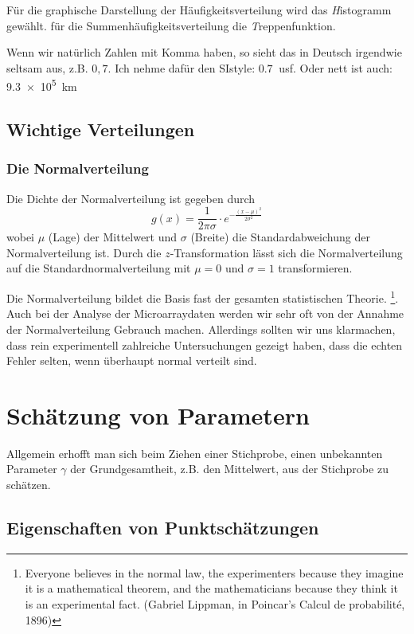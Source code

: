 Für die graphische Darstellung der Häufigkeitsverteilung wird das {\textit Histogramm} gewählt. für die Summenhäufigkeitsverteilung die {\textit Treppenfunktion}.

Wenn wir natürlich Zahlen mit Komma haben, so sieht das in Deutsch irgendwie seltsam aus, z.B. $0,7$. Ich nehme dafür den SIstyle: $\SI{0,7}{}$ usf.  Oder nett ist auch: \SI{9.3e5}{km}


%
\subsection{Wichtige Verteilungen}

\subsubsection{Die Normalverteilung}
Die Dichte der Normalverteilung ist gegeben durch
\begin{equation}\label{eqn:dichtenormal}
g(x) = \frac{1}{2\pi\sigma}\cdot e^{-\frac{(x-\mu)^2}{2\sigma^2}}
\end{equation}
wobei $\mu$ (Lage) der Mittelwert und $\sigma$ (Breite) die Standardabweichung der Normalverteilung ist. 
Durch die $z$-Transformation lässt sich die Normalverteilung auf die Standardnormalverteilung mit $\mu=0$ und $\sigma=1$ transformieren.

Die Normalverteilung bildet die Basis fast der gesamten statistischen Theorie. \footnote{ 
	\glqq Everyone believes in the normal law, the experimenters because they imagine it is a mathematical theorem, and the mathematicians because they think it is an experimental fact.\grqq{} (Gabriel Lippman, in Poincar's Calcul de probabilité, 1896)}. Auch bei der Analyse der Microarraydaten werden wir sehr oft von der Annahme der Normalverteilung Gebrauch machen. Allerdings sollten wir uns klarmachen, dass  rein experimentell zahlreiche Untersuchungen gezeigt haben, dass die echten Fehler selten, wenn überhaupt normal verteilt sind.


\section{Schätzung von Parametern}
Allgemein erhofft man sich beim Ziehen einer Stichprobe, einen unbekannten Parameter $\gamma$ der Grundgesamtheit, z.B. den Mittelwert, aus der Stichprobe zu schätzen.
\subsection{Eigenschaften von Punktschätzungen}

